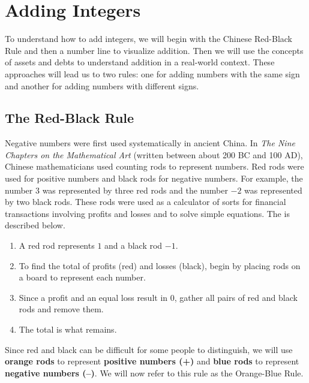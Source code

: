 \documentclass{ximera}[font=12pt]
\begin{document}
\section*{Adding Integers}

To understand how to add integers, we will begin with the Chinese Red-Black Rule and then a number line to visualize addition.  Then we will 
use the concepts of assets and debts to understand addition in a real-world context.  These approaches will lead us to two rules: one for adding 
numbers with the same sign and another for adding numbers with different signs.

\subsection*{The Red-Black Rule}

Negative numbers were first used systematically in ancient China. In \emph{The Nine Chapters on the Mathematical Art} (written between about 200 BC and 100 AD), Chinese mathematicians used counting rods to represent numbers.  Red rods were used for positive numbers and black rods for negative numbers.  For example, the number 3 was
represented by three red rods and the number $-2$ was represented by two black rods.  These rods were used as a calculator of sorts for financial 
transactions involving profits and losses and to solve simple equations.  The  is described below.

\begin{enumerate}%
\item A red rod represents $1$ and a black rod $-1.$  

\item To find the total of profits (red) and losses (black), begin by placing rods on a board to represent each number.

\item Since a profit and an equal loss result in 0, gather all pairs of red and black rods and remove them.

\item The total is what remains.
\end{enumerate}


Since red and black can be difficult for some people to distinguish, we will use \textcolor{orange!85!black}{\textbf{orange rods}} to 
represent \textcolor{orange!85!black}{\textbf{positive numbers (+)}} and \textcolor{blue!70!black}{\textbf{blue rods}} to represent 
\textcolor{blue!70!black}{\textbf{negative numbers (--)}}.
We will now refer to this rule as the Orange-Blue Rule.
\end{document}
